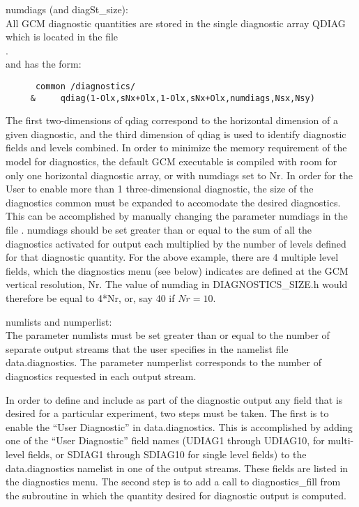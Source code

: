 \noindent numdiags (and diagSt\_size): \\
\noindent All GCM diagnostic quantities are stored in the single diagnostic array QDIAG 
which is located in the file \\ .\\
and has the form:\\
\begin{verbatim}
      common /diagnostics/
     &     qdiag(1-Olx,sNx+Olx,1-Olx,sNx+Olx,numdiags,Nsx,Nsy)
\end{verbatim}
\noindent
The first two-dimensions of qdiag correspond to the horizontal
dimension of a given diagnostic, and the third dimension of qdiag is
used to identify diagnostic fields and levels combined. In order to
minimize the memory requirement of the model for diagnostics, the
default GCM executable is compiled with room for only one horizontal
diagnostic array, or with numdiags set to Nr. In order for the User to
enable more than 1 three-dimensional diagnostic, the size of the
diagnostics common must be expanded to accomodate the desired
diagnostics.  This can be accomplished by manually changing the
parameter numdiags in the file
.
numdiags should be set greater than or equal to the sum of all the
diagnostics activated for output each multiplied by the number of
levels defined for that diagnostic quantity.  For the above example,
there are 4 multiple level fields, which the diagnostics menu (see
below) indicates are defined at the GCM vertical resolution, Nr. The
value of numdiag in DIAGNOSTICS\_SIZE.h would therefore be equal to
4*Nr, or, say 40 if $Nr=10$.

\noindent numlists and numperlist: \\
\noindent The parameter numlists must be set greater than or equal to
the number of separate output streams that the user specifies in the
namelist file data.diagnostics.  The parameter numperlist corresponds
to the number of diagnostics requested in each output stream.

\noindent
In order to define and include as part of the diagnostic output any
field that is desired for a particular experiment, two steps must be
taken. The first is to enable the ``User Diagnostic'' in
data.diagnostics. This is accomplished by adding one of the ``User
Diagnostic'' field names (UDIAG1 through UDIAG10, for multi-level
fields, or SDIAG1 through SDIAG10 for single level fields) to the
data.diagnostics namelist in one of the output streams. These fields
are listed in the diagnostics menu. The second step is to add a call
to diagnostics\_fill from the subroutine in which the quantity desired
for diagnostic output is computed.

